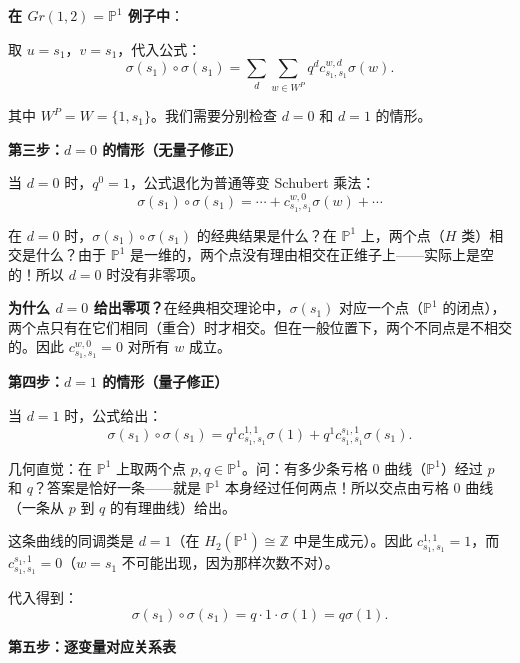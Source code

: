 \textbf{在 $Gr(1,2) = \mathbb{P}^1$ 例子中}：

取 $u = s_1$，$v = s_1$，代入公式：
$$\sigma(s_1) \circ \sigma(s_1) = \sum_{d} \sum_{w \in W^{P}} q^d c_{s_1,s_1}^{w,d} \sigma(w).$$

其中 $W^{P} = W = \{1, s_1\}$。我们需要分别检查 $d = 0$ 和 $d = 1$ 的情形。

\textbf{第三步：$d = 0$ 的情形（无量子修正）}

当 $d = 0$ 时，$q^0 = 1$，公式退化为普通等变 Schubert 乘法：
$$\sigma(s_1) \circ \sigma(s_1) = \cdots + c_{s_1,s_1}^{w,0} \sigma(w) + \cdots$$

在 $d = 0$ 时，$\sigma(s_1) \circ \sigma(s_1)$ 的经典结果是什么？在 $\mathbb{P}^1$ 上，两个点（$H$ 类）相交是什么？由于 $\mathbb{P}^1$ 是一维的，两个点没有理由相交在正维子上——实际上是空的！所以 $d = 0$ 时没有非零项。

\textbf{为什么 $d = 0$ 给出零项？}在经典相交理论中，$\sigma(s_1)$ 对应一个点（$\mathbb{P}^1$ 的闭点），两个点只有在它们相同（重合）时才相交。但在一般位置下，两个不同点是不相交的。因此 $c_{s_1,s_1}^{w,0} = 0$ 对所有 $w$ 成立。

\textbf{第四步：$d = 1$ 的情形（量子修正）}

当 $d = 1$ 时，公式给出：
$$\sigma(s_1) \circ \sigma(s_1) = q^1 c_{s_1,s_1}^{1,1} \sigma(1) + q^1 c_{s_1,s_1}^{s_1,1} \sigma(s_1).$$

几何直觉：在 $\mathbb{P}^1$ 上取两个点 $p, q \in \mathbb{P}^1$。问：有多少条亏格 0 曲线（$\mathbb{P}^1$）经过 $p$ 和 $q$？答案是恰好一条——就是 $\mathbb{P}^1$ 本身经过任何两点！所以交点由亏格 0 曲线（一条从 $p$ 到 $q$ 的有理曲线）给出。

这条曲线的同调类是 $d = 1$（在 $H_2(\mathbb{P}^1) \cong \mathbb{Z}$ 中是生成元）。因此 $c_{s_1,s_1}^{1,1} = 1$，而 $c_{s_1,s_1}^{s_1,1} = 0$（$w = s_1$ 不可能出现，因为那样次数不对）。

代入得到：
$$\sigma(s_1) \circ \sigma(s_1) = q \cdot 1 \cdot \sigma(1) = q \sigma(1).$$

\textbf{第五步：逐变量对应关系表}

